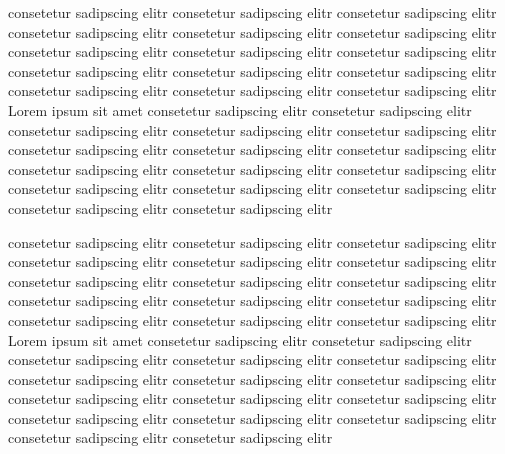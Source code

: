 \documentclass[]{book}
\begin{document}
\Pages
\begin{pairs}
    \begin{Leftside}
        \beginnumbering
        \pstart\startsub
         {}
       consetetur sadipscing elitr
       consetetur sadipscing elitr
       consetetur sadipscing elitr
       consetetur sadipscing elitr
       consetetur sadipscing elitr
       consetetur sadipscing elitr
       consetetur sadipscing elitr
       consetetur sadipscing elitr
       consetetur sadipscing elitr
       consetetur sadipscing elitr
       consetetur sadipscing elitr
       consetetur sadipscing elitr
       consetetur sadipscing elitr
       consetetur sadipscing elitr
       consetetur sadipscing elitr
        \endsub\pend
        \pstart
       Lorem ipsum {} sit amet
       consetetur sadipscing elitr
       consetetur sadipscing elitr
       consetetur sadipscing elitr
       consetetur sadipscing elitr
       consetetur sadipscing elitr
       consetetur sadipscing elitr
       consetetur sadipscing elitr
       consetetur sadipscing elitr
       consetetur sadipscing elitr
       consetetur sadipscing elitr
       consetetur sadipscing elitr
       consetetur sadipscing elitr
       consetetur sadipscing elitr
       consetetur sadipscing elitr
       consetetur sadipscing elitr
       consetetur sadipscing elitr
       \pend
       \endnumbering
    \end{Leftside}
    \begin{Rightside}
        \beginnumbering
        \pstart\startsub
         {}
       consetetur sadipscing elitr
       consetetur sadipscing elitr
       consetetur sadipscing elitr
       consetetur sadipscing elitr
       consetetur sadipscing elitr
       consetetur sadipscing elitr
       consetetur sadipscing elitr
       consetetur sadipscing elitr
       consetetur sadipscing elitr
       consetetur sadipscing elitr
       consetetur sadipscing elitr
       consetetur sadipscing elitr
       consetetur sadipscing elitr
       consetetur sadipscing elitr
       consetetur sadipscing elitr
        \endsub\pend
        \pstart
       Lorem ipsum  {} sit amet
       consetetur sadipscing elitr
       consetetur sadipscing elitr
       consetetur sadipscing elitr
       consetetur sadipscing elitr
       consetetur sadipscing elitr
       consetetur sadipscing elitr
       consetetur sadipscing elitr
       consetetur sadipscing elitr
       consetetur sadipscing elitr
       consetetur sadipscing elitr
       consetetur sadipscing elitr
       consetetur sadipscing elitr
       consetetur sadipscing elitr
       consetetur sadipscing elitr
       consetetur sadipscing elitr
       consetetur sadipscing elitr
       \pend
        \endnumbering
    \end{Rightside}
\end{pairs}
\Columns
\end{document}
